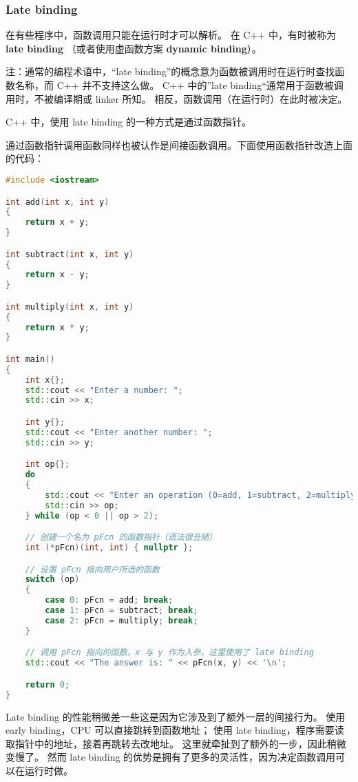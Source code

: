 \documentclass[../../LearnCpp.tex]{subfiles}
\begin{document}
\subsubsection*{Late binding}

在有些程序中，函数调用只能在运行时才可以解析。
在 C++ 中，有时被称为 \textbf{late binding} （或者使用虚函数方案 \textbf{dynamic binding}）。

注：通常的编程术语中，“late binding”的概念意为函数被调用时在运行时查找函数名称，而 C++ 并不支持这么做。
C++ 中的”late binding“通常用于函数被调用时，不被编译期或 linker 所知。
相反，函数调用（在运行时）在此时被决定。

C++ 中，使用 late binding 的一种方式是通过函数指针。

通过函数指针调用函数同样也被认作是间接函数调用。下面使用函数指针改造上面的代码：

\begin{lstlisting}[language=C++]
#include <iostream>

int add(int x, int y)
{
    return x + y;
}

int subtract(int x, int y)
{
    return x - y;
}

int multiply(int x, int y)
{
    return x * y;
}

int main()
{
    int x{};
    std::cout << "Enter a number: ";
    std::cin >> x;

    int y{};
    std::cout << "Enter another number: ";
    std::cin >> y;

    int op{};
    do
    {
        std::cout << "Enter an operation (0=add, 1=subtract, 2=multiply): ";
        std::cin >> op;
    } while (op < 0 || op > 2);

    // 创建一个名为 pFcn 的函数指针（语法很丑陋）
    int (*pFcn)(int, int) { nullptr };

    // 设置 pFcn 指向用户所选的函数
    switch (op)
    {
        case 0: pFcn = add; break;
        case 1: pFcn = subtract; break;
        case 2: pFcn = multiply; break;
    }

    // 调用 pFcn 指向的函数，x 与 y 作为入参，这里使用了 late binding
    std::cout << "The answer is: " << pFcn(x, y) << '\n';

    return 0;
}
\end{lstlisting}

Late binding 的性能稍微差一些这是因为它涉及到了额外一层的间接行为。
使用 early binding，CPU 可以直接跳转到函数地址；
使用 late binding，程序需要读取指针中的地址，接着再跳转去改地址。
这里就牵扯到了额外的一步，因此稍微变慢了。
然而 late binding 的优势是拥有了更多的灵活性，因为决定函数调用可以在运行时做。
\end{document}
